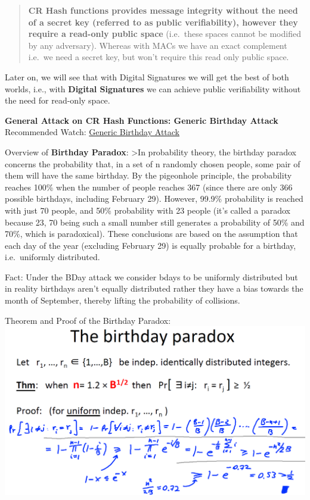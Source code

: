\documentclass[11pt]{article}
\makeatletter
\def\maxwidth{\ifdim\Gin@nat@width>\linewidth\linewidth
    \else\Gin@nat@width\fi}
\let\Oldincludegraphics\includegraphics
\renewcommand{\includegraphics}[1]{\Oldincludegraphics[width=.8\maxwidth]{#1}}
\makeatother
\begin{document}
\begin{quote}
\textbf{CR Hash functions provides message integrity without the need of
a secret key (referred to as public verifiability), however they require
a read-only public space} (i.e.~these spaces cannot be modified by any
adversary). Whereas with MACs we have an exact complement i.e.~we need a
secret key, but won't require this read only public space.
\end{quote}

Later on, we will see that with Digital Signatures we will get the best
of both worlds, i.e., with \textbf{Digital Signatures} we can achieve
public verifiability without the need for read-only space.

\textbf{General Attack on CR Hash Functions: Generic Birthday Attack}
Recommended Watch:
\href{https://www.coursera.org/learn/crypto/lecture/pyR4I/generic-birthday-attack}{Generic
Birthday Attack}

Overview of \textbf{Birthday Paradox}: \textgreater{}In probability
theory, the birthday paradox concerns the probability that, in a set of
n randomly chosen people, some pair of them will have the same birthday.
By the pigeonhole principle, the probability reaches 100\% when the
number of people reaches 367 (since there are only 366 possible
birthdays, including February 29). However, 99.9\% probability is
reached with just 70 people, and 50\% probability with 23 people (it's
called a paradox because 23, 70 being such a small number still
generates a probability of 50\% and 70\%, which is paradoxical). These
conclusions are based on the assumption that each day of the year
(excluding February 29) is equally probable for a birthday,
i.e.~uniformly distributed.

Fact: Under the BDay attack we consider bdays to be uniformly
distributed but in reality birthdays aren't equally distributed rather
they have a bias towards the month of September, thereby lifting the
probability of collisions.

Theorem and Proof of the Birthday Paradox:
\includegraphics{./Images/TheBirthdayParadox.png}
\end{document}
